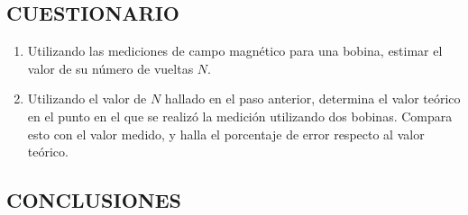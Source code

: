 \documentclass[10pt, twoside]{article}
\begin{document}
\subsection{CUESTIONARIO}%
\begin{enumerate}[label=\roman*]
	\item Utilizando las mediciones de campo magnético para una bobina,
		estimar el valor de su número de vueltas $N$.
	\item Utilizando el valor de $N$ hallado en el paso anterior,
		determina el valor teórico en el punto en el que se realizó la medición
		utilizando dos bobinas.
		Compara esto con el valor medido,
		y halla el porcentaje de error respecto al valor teórico.
\end{enumerate}

\subsection{CONCLUSIONES}%
\end{document}
